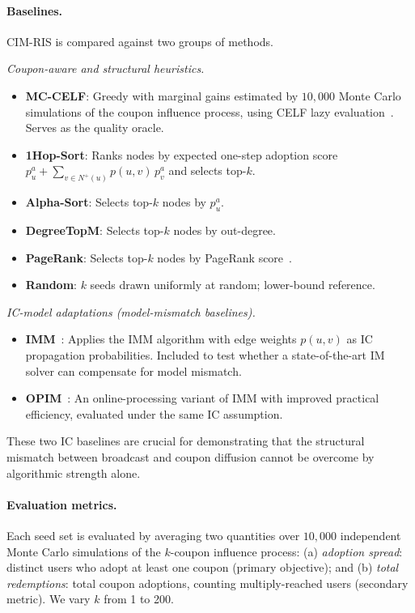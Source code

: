 \documentclass[sigconf]{acmart}
\newcommand{\CIMRIS}{\textsc{CIM-RIS}}
\begin{document}
\paragraph{Baselines.}
\CIMRIS{} is compared against two groups of methods.

\smallskip\noindent\textit{Coupon-aware and structural heuristics.}
\begin{itemize}[leftmargin=*]
  \item \textbf{MC-CELF}: Greedy with marginal gains estimated by
    $10{,}000$ Monte Carlo simulations of the coupon influence process,
    using CELF lazy evaluation~\cite{leskovec2007celf}.
    Serves as the quality oracle.
  \item \textbf{1Hop-Sort}: Ranks nodes by expected one-step adoption
    score $p_u^a + \sum_{v \in N^+(u)} p(u,v)\,p_v^a$ and selects
    top-$k$.
  \item \textbf{Alpha-Sort}: Selects top-$k$ nodes by $p_u^a$.
  \item \textbf{DegreeTopM}: Selects top-$k$ nodes by out-degree.
  \item \textbf{PageRank}: Selects top-$k$ nodes by PageRank
    score~\cite{page1999pagerank}.
  \item \textbf{Random}: $k$ seeds drawn uniformly at random;
    lower-bound reference.
\end{itemize}

\smallskip\noindent\textit{IC-model adaptations (model-mismatch baselines).}
\begin{itemize}[leftmargin=*]
  \item \textbf{IMM}~\cite{tang2015influence}: Applies the IMM
    algorithm with edge weights $p(u,v)$ as IC propagation
    probabilities.  Included to test whether a state-of-the-art IM
    solver can compensate for model mismatch.
  \item \textbf{OPIM}~\cite{tang2018online}: An online-processing
    variant of IMM with improved practical efficiency, evaluated under
    the same IC assumption.
\end{itemize}

These two IC baselines are crucial for demonstrating that the
structural mismatch between broadcast and coupon diffusion cannot
be overcome by algorithmic strength alone.

\paragraph{Evaluation metrics.}
Each seed set is evaluated by averaging two quantities over $10{,}000$
independent Monte Carlo simulations of the $k$-coupon influence process:
(a) \emph{adoption spread}: distinct users who adopt at least one
coupon (primary objective); and (b) \emph{total redemptions}: total
coupon adoptions, counting multiply-reached users (secondary metric).
We vary $k$ from 1 to 200.
\end{document}
